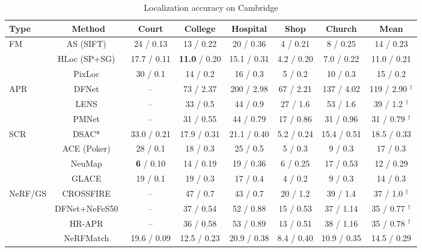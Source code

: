 \begin{table}[tp]
\centering
\footnotesize
\setlength{\tabcolsep}{2.5pt}
\renewcommand{\arraystretch}{1.1}
\caption{Localization accuracy on Cambridge}
\label{tab:t1}
\begin{tabular}{lccccccc}
\toprule
Type & Method & Court & College & Hospital & Shop & Church & Mean \\
\midrule
FM & AS (SIFT)~\cite{reported260504730v1bibbib55} & 24 / 0.13 & 13 / 0.22 & 20 / 0.36 & 4 / 0.21 & 8 / 0.25 & 14 / 0.23 \\
 & HLoc (SP+SG)~\cite{sarlin2019hloc} & 17.7 / 0.11 & \textbf{11.0} / 0.20 & 15.1 / 0.31 & 4.2 / 0.20 & 7.0 / 0.22 & 11.0 / 0.21 \\
 & PixLoc~\cite{reported260504730v1bibbib20} & 30 / 0.1 & 14 / 0.2 & 16 / 0.3 & 5 / 0.2 & 10 / 0.3 & 15 / 0.2 \\
\midrule
APR & DFNet~\cite{reported260504730v1bibbib26} & -- & 73 / 2.37 & 200 / 2.98 & 67 / 2.21 & 137 / 4.02 & 119 / 2.90 $^\dagger$ \\
 & LENS~\cite{reported260504730v1bibbib29} & -- & 33 / 0.5 & 44 / 0.9 & 27 / 1.6 & 53 / 1.6 & 39 / 1.2 $^\dagger$ \\
 & PMNet~\cite{reported260504730v1bibbib28} & -- & 31 / 0.55 & 44 / 0.79 & 17 / 0.86 & 31 / 0.96 & 31 / 0.79 $^\dagger$ \\
\midrule
SCR & DSAC*~\cite{brachmann2021dsacstar} & 33.0 / 0.21 & 17.9 / 0.31 & 21.1 / 0.40 & 5.2 / 0.24 & 15.4 / 0.51 & 18.5 / 0.33 \\
 & ACE (Poker)~\cite{brachmann2023ace} & 28 / 0.1 & 18 / 0.3 & 25 / 0.5 & 5 / 0.3 & 9 / 0.3 & 17 / 0.3 \\
 & NeuMap~\cite{reported260504730v1bibbib7} & \textbf{6} / 0.10 & 14 / 0.19 & 19 / 0.36 & 6 / 0.25 & 17 / 0.53 & 12 / 0.29 \\
 & GLACE~\cite{reported260504730v1bibbib37} & 19 / 0.1 & 19 / 0.3 & 17 / 0.4 & 4 / 0.2 & 9 / 0.3 & 14 / 0.3 \\
\midrule
NeRF/GS & CROSSFIRE~\cite{reported260504730v1bibbib42} & -- & 47 / 0.7 & 43 / 0.7 & 20 / 1.2 & 39 / 1.4 & 37 / 1.0 $^\dagger$ \\
 & DFNet+NeFeS50~\cite{reported260504730v1bibbib27} & -- & 37 / 0.54 & 52 / 0.88 & 15 / 0.53 & 37 / 1.14 & 35 / 0.77 $^\dagger$ \\
 & HR-APR~\cite{reported260504730v1bibbib58} & -- & 36 / 0.58 & 53 / 0.89 & 13 / 0.51 & 38 / 1.16 & 35 / 0.78 $^\dagger$ \\
 & NeRFMatch~\cite{zhou2024nerfmatch} & 19.6 / 0.09 & 12.5 / 0.23 & 20.9 / 0.38 & 8.4 / 0.40 & 10.9 / 0.35 & 14.5 / 0.29 \\

\end{tabular}
\end{table}
